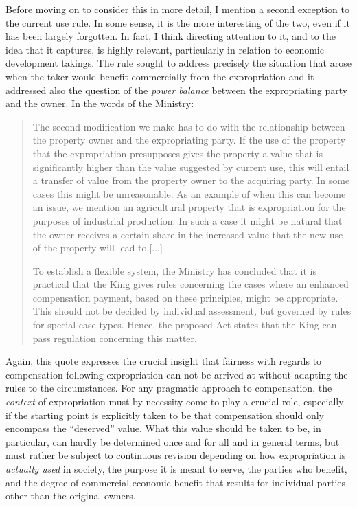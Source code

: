 Before moving on to consider this in more detail, I mention a second exception to the current use rule. In some sense, it is the more interesting of the two, even if it has been largely forgotten. In fact, I think directing attention to it, and to the idea that it captures, is highly relevant, particularly in relation to economic development takings. The rule sought to address precisely the situation that arose when the taker would benefit commercially from the expropriation and it addressed also the question of the \emph{power balance} between the expropriating party and the owner. In the words of the Ministry:

\begin{quote}
The second modification we make has to do with the relationship between the property owner and the expropriating party. If the use of the property that the expropriation presupposes gives the property a value that is significantly higher than the value suggested by current use, this will entail a transfer of value from the property owner to the acquiring party. In some cases this might be unreasonable. As an example of when this can become an issue, we mention an agricultural property that is expropriation for the purposes of industrial production. In such a case it might be natural that the owner receives a certain share in the increased value that the new use of the property will lead to.[...] %

To establish a flexible system, the Ministry has concluded that it is practical that the King gives rules concerning the cases where an enhanced compensation payment, based on these principles, might be appropriate. This should not be decided by individual assessment, but governed by rules for special case types. Hence, the proposed Act states that the King can pass regulation concerning this matter.
\end{quote}

Again, this quote expresses the crucial insight that fairness with regards to compensation following expropriation can not be arrived at without adapting the rules to the circumstances. For any pragmatic approach to compensation, the \emph{context} of expropriation must by necessity come to play a crucial role, especially if the starting point is explicitly taken to be that compensation should only encompass the ``deserved'' value. What this value should be taken to be, in particular, can hardly be determined once and for all and in general terms, but must rather be subject to continuous revision depending on how expropriation is \emph{actually used} in society, the purpose it is meant to serve, the parties who benefit, and the degree of commercial economic benefit that results for individual parties other than the original owners.


